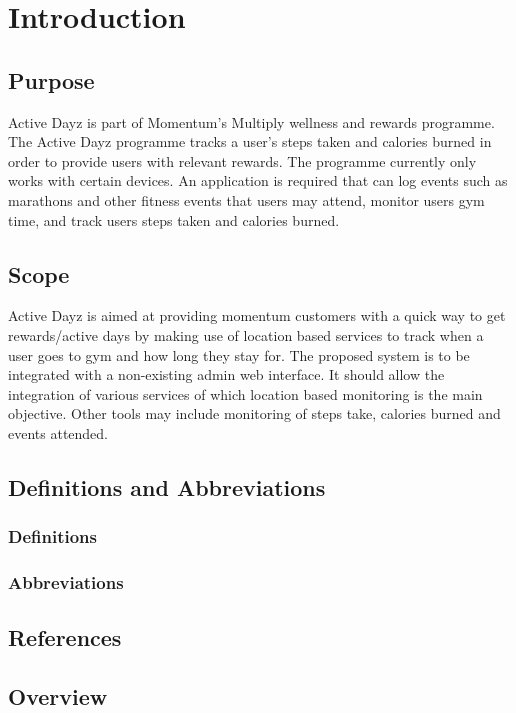 \documentclass[11pt]{article}
\begin{document}
\newpage
\tableofcontents

\newpage

\section{Introduction}
\subsection{Purpose}
Active Dayz is part of Momentum's Multiply wellness and rewards programme. The Active Dayz programme tracks a user's steps taken and calories burned in order to provide users with relevant rewards. The programme currently only works with certain devices. An application is required that can log events such as marathons and other fitness events that users may attend, monitor users gym time, and track users steps taken and calories burned.

\subsection{Scope}
Active Dayz is aimed at providing momentum customers  with a quick way to get rewards/active days by making use of location based services to track when a user goes to gym and how long they stay for.
\newline
\newline
The proposed system is to be integrated with a non-existing admin web interface. It should allow the integration of various services of which location based monitoring is the main objective. Other tools may include monitoring of steps take, calories burned and events attended.

\subsection{Definitions and Abbreviations}
\subsubsection{Definitions}
\subsubsection{Abbreviations}

\subsection{References}
\subsection{Overview}
\newpage
\end{document}
